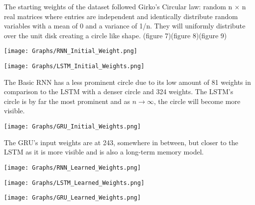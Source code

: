 \documentclass{article}
\begin{document}
The starting weights of the dataset followed Girko's Circular law:
random n $\times$ n real matrices
where entries are independent and identically distribute random variables with a mean of 0 and a variance of 1/n. They will uniformly distribute over the unit disk creating a circle like shape. \cite{meckes2021} (figure 7)(figure 8)(figure 9)
\begin{center}
    \begin{minipage}{0.48\linewidth}
        \texttt{[image: Graphs/RNN\_Initial\_Weight.png]}
    \end{minipage}
    \begin{minipage}{0.48\linewidth}
     \texttt{[image: Graphs/LSTM\_Initial\_Weights.png]}    
    \end{minipage}
\end{center}
The Basic RNN has a less prominent circle due to its low amount of 81 weights in comparison to the LSTM with a  denser circle and 324 weights. The LSTM's circle is by far the most prominent and as ${n\to\infty}$, the circle will become more visible.
\begin{center}
    \begin{minipage}{0.48\linewidth}
     \texttt{[image: Graphs/GRU\_Initial\_Weights.png]}    
    \end{minipage}
\end{center}
The GRU's input weights are at 243, somewhere in between, but closer to the LSTM as it is more visible and is also a long-term memory model.
\begin{center}
    \begin{minipage}{0.48\linewidth}
        \texttt{[image: Graphs/RNN\_Learned\_Weights.png]}
    \end{minipage}
    \begin{minipage}{0.48\linewidth}
     \texttt{[image: Graphs/LSTM\_Learned\_Weights.png]}    
    \end{minipage}
    \begin{minipage}{0.48\linewidth}
    \texttt{[image: Graphs/GRU\_Learned\_Weights.png]}
    \end{minipage}
\end{center}
\end{document}
